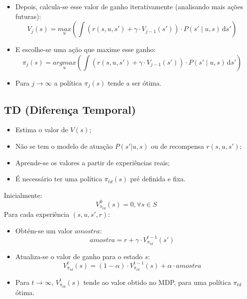 \documentclass{beamer}
\begin{document}
\begin{frame}

\begin{itemize}
	\item Depois, calcula-se esse valor de ganho iterativamente (analisando mais ações futuras): $$ V_j \left( s \right) = \underset{u}{max} \left( \int \! \left( r \left( s, u, s' \right) + \gamma \cdot V_{j-1} \left( s' \right) \right) \cdot P \left( s' \mid u, s \right) \, \mathrm{d}s' \right) $$\pause
	\item E escolhe-se uma ação que maxime esse ganho: $$ \pi_j \left( s \right) = \underset{u}{argmax} \left( \int \! \left( r \left( s, u, s' \right) + \gamma \cdot V_{j-1} \left( s' \right) \right) \cdot P \left( s' \mid u, s \right) \, \mathrm{d}s' \right) $$\pause
	\item Para $ j \rightarrow \infty $ a política $ \pi_j \left( s \right) $ tende a ser ótima.
\end{itemize}
\end{frame}



\subsection{TD (Diferença Temporal)}

\begin{frame}
\begin{itemize}
	\item Estima o valor de $ V \left( s \right) $;\pause
	\item Não se tem o modelo de atuação $ P \left(s' | u, s \right) $
	ou de recompensa $ r \left( s, u, s' \right) $;\pause
	\item Aprende-se os valores a partir de experiências reais;\pause
	\item É necessário ter uma política $ \pi_{td} \left( s \right) $ pré definida e fixa.
\end{itemize}
\end{frame}


\begin{frame}
Inicialmente:
$$V_{\pi_{td}}^0 \left( s \right) = 0 , \forall s \in S $$\pause
Para cada experiência $ \left( s, u, s', r \right) $:\pause
\begin{itemize}
	\item Obtém-se um valor $ amostra $:
		$$ amostra = r + \gamma \cdot V_{\pi_{td}}^{t-1} \left( s' \right) $$\pause
	\item Atualiza-se o valor de ganho para o estado $ s $:
		$$ V_{\pi_{td}}^t \left( s \right) = \left( 1 - \alpha \right) \cdot V_{\pi_{td}}^{t-1} \left( s \right) + \alpha \cdot amostra $$\pause
	\item Para $ t \rightarrow \infty $, $ V_{\pi_{td}}^t \left( s \right) $ tende ao valor obtido no MDP, para uma política $ \pi_{td} $ ótima.
\end{itemize}
\end{frame}
\end{document}
